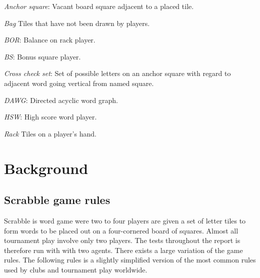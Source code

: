 \documentclass[a4paper, 12pt]{report}
\begin{document}
\begin{description}
\item{\emph{Anchor square}}: Vacant board square adjacent to a placed tile.

\item{\emph{Bag}} Tiles that have not been drawn by players.

\item{\emph{BOR}}: Balance on rack player.

\item{\emph{BS}}: Bonus square player.

\item{\emph{Cross check set}}: Set of possible letters on an anchor square with regard to adjacent word going vertical from named square.

\item{\emph{DAWG}}: Directed acyclic word graph.

\item{\emph{HSW}}: High score word player.

\item{\emph{Rack}} Tiles on a player's hand. 

\end{description}







\chapter{Background}

\section{Scrabble game rules}
Scrabble is word game were two to four players are given a set of letter tiles to form words to be placed out on a four-cornered board of squares. Almost all tournament play involve only two players. The tests throughout the report is therefore run with with two agents. There exists a large variation of the game rules. The following rules is a slightly simplified version of the most common rules used by clubs and tournament play worldwide.
\end{document}
